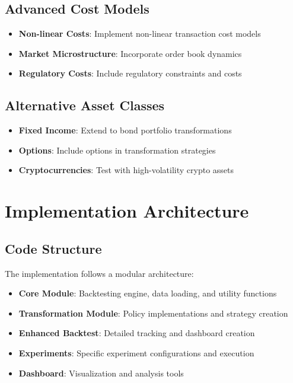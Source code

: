 \documentclass[11pt, letterpaper]{article}
\begin{document}
\subsection{Advanced Cost Models}
\begin{itemize}
    \item \textbf{Non-linear Costs}: Implement non-linear transaction cost models
    \item \textbf{Market Microstructure}: Incorporate order book dynamics
    \item \textbf{Regulatory Costs}: Include regulatory constraints and costs
\end{itemize}

\subsection{Alternative Asset Classes}
\begin{itemize}
    \item \textbf{Fixed Income}: Extend to bond portfolio transformations
    \item \textbf{Options}: Include options in transformation strategies
    \item \textbf{Cryptocurrencies}: Test with high-volatility crypto assets
\end{itemize}

\section{Implementation Architecture}

\subsection{Code Structure}
The implementation follows a modular architecture:
\begin{itemize}
    \item \textbf{Core Module}: Backtesting engine, data loading, and utility functions
    \item \textbf{Transformation Module}: Policy implementations and strategy creation
    \item \textbf{Enhanced Backtest}: Detailed tracking and dashboard creation
    \item \textbf{Experiments}: Specific experiment configurations and execution
    \item \textbf{Dashboard}: Visualization and analysis tools
\end{itemize}
\end{document}
